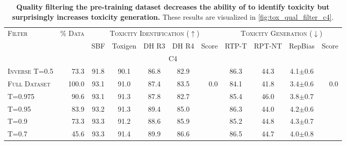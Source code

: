 
\begingroup
\setlength{\tabcolsep}{4pt}
\begin{table*}[ht]
    \centering
    \small
    \caption{
    \textbf{Quality filtering the pre-training dataset decreases the ability of \bigLM to identify toxicity but surprisingly increases toxicity generation.}
    These results are visualized in \cref{fig:tox_qual_filter_c4}.}
    \label{tab:qual-filter-results}
    
    \begin{tabular}{l | r | cccc | r || ccc | r}
    \toprule
    \textsc{Filter} & \textsc{\% Data} & \multicolumn{5}{c}{\textsc{Toxicity Identification ($\uparrow$)}} & \multicolumn{4}{c}{\textsc{Toxicity Generation ($\downarrow$)}} \\
    & & SBF & Toxigen & DH R3 & DH R4 & Score & RTP-T & RPT-NT & RepBias & Score \\
    \midrule
    \multicolumn{11}{c}{\textsc{C4}} \\
    \midrule
  
    \textsc{Inverse T=0.5} & 73.3 & 91.8 & 90.1 & 86.8 & 82.9 & \cellcolor{color3!9}{-0.9} & 86.3 & 44.3 & 4.1$\pm$0.6 & \cellcolor{forestgreen!41}{+9.7} \\
    \textsc{Full Dataset} & 100.0 & 93.1 & 91.0 & 87.4 & 83.5 & 0.0 & 84.1 & 41.8 & 3.4$\pm$0.6 & 0.0 \\
    \textsc{T=0.975} & 90.6 & 93.1 & 91.3 & 87.8 & 82.7 & \cellcolor{color3!3}{-0.1} & 85.4 & 46.0 & 3.8$\pm$0.7 & \cellcolor{forestgreen!16}{+7.3} \\
    \textsc{T=0.95} & 83.9 & 93.2 & 91.3 & 89.4 & 85.0 & \cellcolor{forestgreen!11}{+1.1} & 86.3 & 44.0 & 4.2$\pm$0.6 & \cellcolor{forestgreen!47}{+10.4} \\
    \textsc{T=0.9} & 73.3 & 93.3 & 91.2 & 88.6 & 85.9 & \cellcolor{forestgreen!12}{+1.2} & 85.2 & 44.8 & 4.3$\pm$0.7 & \cellcolor{forestgreen!60}{+11.1} \\
    \textsc{T=0.7} & 45.6 & 93.3 & 91.4 & 89.9 & 86.6 & \cellcolor{forestgreen!18}{+1.8} & 86.5 & 44.7 & 4.0$\pm$0.8 & \cellcolor{forestgreen!40}{+9.6} \\

    \bottomrule
    \end{tabular}
\end{table*}
\endgroup
